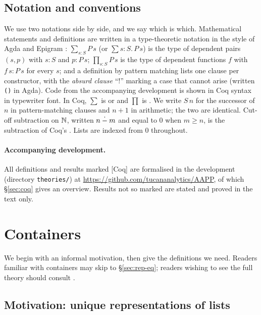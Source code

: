 \documentclass{fundam}
\begin{document}
\subsection{Notation and conventions}\label{sec:notation}

We use two notations side by side, and we say which is which.  Mathematical statements and
definitions are written in a type-theoretic notation in the style of Agda and
Epigram \cite{McBrideMcKinna04}: $\sum_{s:S} P\,s$ (or $\sum s : S.\, P\,s$) is the type of
dependent pairs $(s, p)$ with $s : S$ and $p : P\,s$; $\prod_{s:S} P\,s$ is the type of
dependent functions $f$ with $f\,s : P\,s$ for every $s$; and a definition by pattern
matching lists one clause per constructor, with the \emph{absurd clause} ``$!$''
marking a case that cannot arise (written \verb|()| in Agda).  Code from the accompanying
development is shown in Coq syntax in typewriter font.  In Coq, $\sum$ is  or
 and $\prod$ is .  We write $S\,n$ for the successor of
$n$ in pattern-matching clauses and $n + 1$ in arithmetic; the two are identical.
Cut-off subtraction on $\mathbb{N}$, written $n \mathbin{\dot{-}} m$ and equal to $0$ when $m \ge n$, is
the subtraction of Coq's .  Lists are indexed from $0$ throughout.

\paragraph{Accompanying development.}  All definitions and results marked
\textsf{[Coq]} are formalised in the development (directory \texttt{theories/}) at
\url{https://github.com/tucananalytics/AAPP}, of which \S\ref{sec:coq} gives an overview.
Results not so marked are stated and proved in the text only.

\section{Containers}\label{sec:containers}

We begin with an informal motivation, then give the definitions we need.  Readers familiar
with containers may skip to \S\ref{sec:rep-eq}; readers wishing to see the full theory
should consult \cite{AbbottAltenkirchGhani05}.

\subsection{Motivation: unique representations of lists}\label{sec:motivation}
\end{document}
